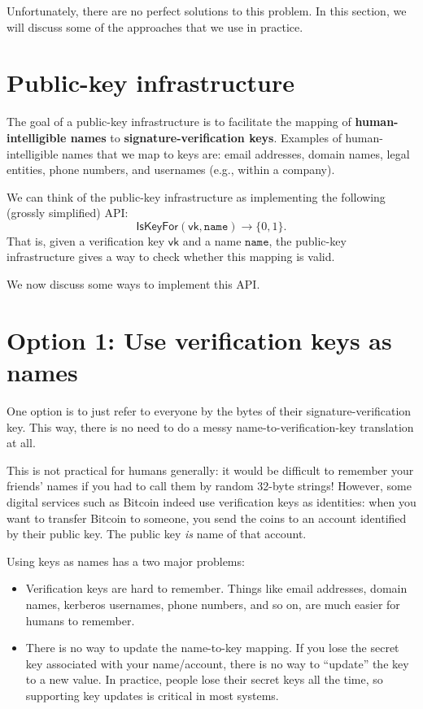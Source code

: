 \documentclass[
  letterpaper,
]{scrbook}
\providecommand{\tightlist}{%
  \setlength{\itemsep}{0pt}\setlength{\parskip}{0pt}}
\newcommand{\zo}{\{0,1\}}
\newcommand{\vk}{\mathsf{vk}}
\theoremstyle{definition}
\theoremstyle{plain}
\theoremstyle{plain}
\theoremstyle{remark}
\begin{document}
Unfortunately, there are no perfect solutions to this problem. In this
section, we will discuss some of the approaches that we use in practice.

\section{Public-key infrastructure}\label{public-key-infrastructure-1}

The goal of a public-key infrastructure is to facilitate the mapping of
\textbf{human-intelligible names} to \textbf{signature-verification
keys}. Examples of human-intelligible names that we map to keys are:
email addresses, domain names, legal entities, phone numbers, and
usernames (e.g., within a company).

We can think of the public-key infrastructure as implementing the
following (grossly simplified) API:
\[ \mathsf{IsKeyFor}(\vk, \mathtt{name}) \to \zo.\] That is, given a
verification key \(\vk\) and a name \(\mathtt{name}\), the public-key
infrastructure gives a way to check whether this mapping is valid.

We now discuss some ways to implement this API.

\section{Option 1: Use verification keys as
names}\label{option-1-use-verification-keys-as-names}

One option is to just refer to everyone by the bytes of their
signature-verification key. This way, there is no need to do a messy
name-to-verification-key translation at all.

This is not practical for humans generally: it would be difficult to
remember your friends' names if you had to call them by random 32-byte
strings! However, some digital services such as Bitcoin indeed use
verification keys as identities: when you want to transfer Bitcoin to
someone, you send the coins to an account identified by their public
key. The public key \emph{is} name of that account.

Using keys as names has a two major problems:

\begin{itemize}
\tightlist
\item
  Verification keys are hard to remember. Things like email addresses,
  domain names, kerberos usernames, phone numbers, and so on, are much
  easier for humans to remember.
\item
  There is no way to update the name-to-key mapping. If you lose the
  secret key associated with your name/account, there is no way to
  ``update'' the key to a new value. In practice, people lose their
  secret keys all the time, so supporting key updates is critical in
  most systems.
\end{itemize}
\end{document}
